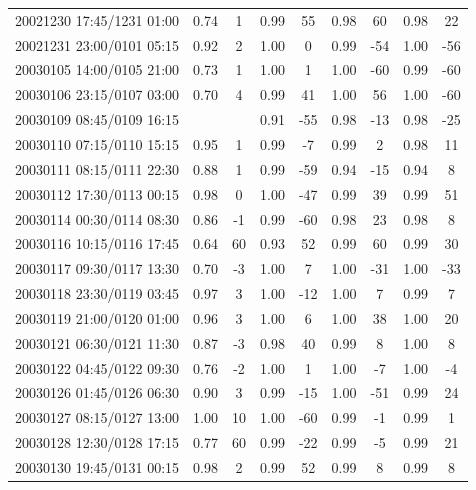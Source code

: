 \documentclass[draft]{agujournal2019}
\begin{document}
\begin{center}
\begin{longtable}{c||cc|cc|cc|cc}
20021230 17:45/1231 01:00 & 0.74 & 1 & 0.99 & 55 & 0.98 & 60 & 0.98 & 22 \\
20021231 23:00/0101 05:15 & 0.92 & 2 & 1.00 & 0 & 0.99 & -54 & 1.00 & -56 \\
20030105 14:00/0105 21:00 & 0.73 & 1 & 1.00 & 1 & 1.00 & -60 & 0.99 & -60 \\
20030106 23:15/0107 03:00 & 0.70 & 4 & 0.99 & 41 & 1.00 & 56 & 1.00 & -60 \\
20030109 08:45/0109 16:15 & & & 0.91 & -55 & 0.98 & -13 & 0.98 & -25 \\
20030110 07:15/0110 15:15 & 0.95 & 1 & 0.99 & -7 & 0.99 & 2 & 0.98 & 11 \\
20030111 08:15/0111 22:30 & 0.88 & 1 & 0.99 & -59 & 0.94 & -15 & 0.94 & 8 \\
20030112 17:30/0113 00:15 & 0.98 & 0 & 1.00 & -47 & 0.99 & 39 & 0.99 & 51 \\
20030114 00:30/0114 08:30 & 0.86 & -1 & 0.99 & -60 & 0.98 & 23 & 0.98 & 8 \\
20030116 10:15/0116 17:45 & 0.64 & 60 & 0.93 & 52 & 0.99 & 60 & 0.99 & 30 \\
20030117 09:30/0117 13:30 & 0.70 & -3 & 1.00 & 7 & 1.00 & -31 & 1.00 & -33 \\
20030118 23:30/0119 03:45 & 0.97 & 3 & 1.00 & -12 & 1.00 & 7 & 0.99 & 7 \\
20030119 21:00/0120 01:00 & 0.96 & 3 & 1.00 & 6 & 1.00 & 38 & 1.00 & 20 \\
20030121 06:30/0121 11:30 & 0.87 & -3 & 0.98 & 40 & 0.99 & 8 & 1.00 & 8 \\
20030122 04:45/0122 09:30 & 0.76 & -2 & 1.00 & 1 & 1.00 & -7 & 1.00 & -4 \\
20030126 01:45/0126 06:30 & 0.90 & 3 & 0.99 & -15 & 1.00 & -51 & 0.99 & 24 \\
20030127 08:15/0127 13:00 & 1.00 & 10 & 1.00 & -60 & 0.99 & -1 & 0.99 & 1 \\
20030128 12:30/0128 17:15 & 0.77 & 60 & 0.99 & -22 & 0.99 & -5 & 0.99 & 21 \\
20030130 19:45/0131 00:15 & 0.98 & 2 & 0.99 & 52 & 0.99 & 8 & 0.99 & 8 \\
\end{longtable}
\end{center}

\pagebreak
\end{document}
